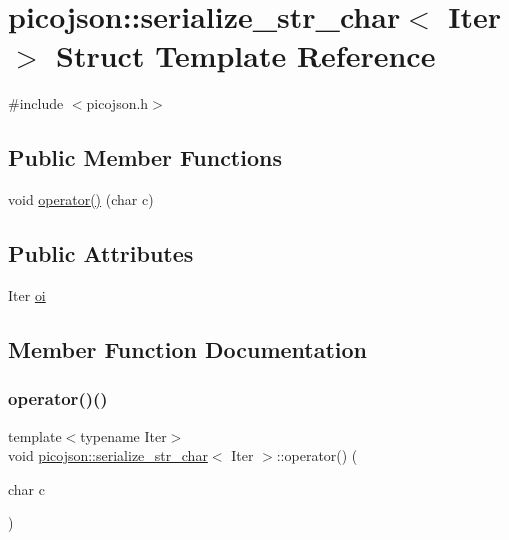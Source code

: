 \hypertarget{structpicojson_1_1serialize__str__char}{}\section{picojson\+:\+:serialize\+\_\+str\+\_\+char$<$ Iter $>$ Struct Template Reference}
\label{structpicojson_1_1serialize__str__char}


{\ttfamily \#include $<$picojson.\+h$>$}

\subsection*{Public Member Functions}
\begin{DoxyCompactItemize}
\item 
void \hyperlink{structpicojson_1_1serialize__str__char_acea559bf2510abf0c3735b02e080308f}{operator()} (char c)
\end{DoxyCompactItemize}
\subsection*{Public Attributes}
\begin{DoxyCompactItemize}
\item 
Iter \hyperlink{structpicojson_1_1serialize__str__char_a1abb88801c571a903ef9e3a21388b944}{oi}
\end{DoxyCompactItemize}


\subsection{Member Function Documentation}
\hypertarget{structpicojson_1_1serialize__str__char_acea559bf2510abf0c3735b02e080308f}{}\label{structpicojson_1_1serialize__str__char_acea559bf2510abf0c3735b02e080308f} 
\subsubsection{\texorpdfstring{operator()()}{operator()()}}
{\footnotesize\ttfamily template$<$typename Iter$>$ \\
void \hyperlink{structpicojson_1_1serialize__str__char}{picojson\+::serialize\+\_\+str\+\_\+char}$<$ Iter $>$\+::operator() (\begin{DoxyParamCaption}\item[{char}]{c }\end{DoxyParamCaption})\hspace{0.3cm}{\ttfamily [inline]}}



